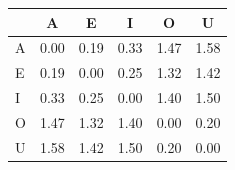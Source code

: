 \begin{tabular}{lccccc}
\toprule
\rowcolor{col01}
 & A & E & I & O & U \\
\midrule
A & 0.00 & 0.19 & 0.33 & 1.47 & 1.58 \\
E & 0.19 & 0.00 & 0.25 & 1.32 & 1.42 \\
I & 0.33 & 0.25 & 0.00 & 1.40 & 1.50 \\
O & 1.47 & 1.32 & 1.40 & 0.00 & 0.20 \\
U & 1.58 & 1.42 & 1.50 & 0.20 & 0.00 \\
\bottomrule
\end{tabular}
